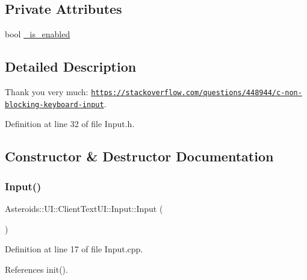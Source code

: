 \subsection*{Private Attributes}
\begin{DoxyCompactItemize}
\item 
bool \hyperlink{classAsteroids_1_1UI_1_1ClientTextUI_1_1Input_a244dd7d6eb9b842cddfaf1296e017ec5}{\+\_\+is\+\_\+enabled}
\end{DoxyCompactItemize}


\subsection{Detailed Description}
Thank you very much\+: \href{https://stackoverflow.com/questions/448944/c-non-blocking-keyboard-input}{\tt https\+://stackoverflow.\+com/questions/448944/c-\/non-\/blocking-\/keyboard-\/input}. 

Definition at line 32 of file Input.\+h.



\subsection{Constructor \& Destructor Documentation}
\mbox{\label{classAsteroids_1_1UI_1_1ClientTextUI_1_1Input_aef07e99edf7199b0d89c185fbac19418}} 
\subsubsection{\texorpdfstring{Input()}{Input()}}
{\footnotesize\ttfamily Asteroids\+::\+U\+I\+::\+Client\+Text\+U\+I\+::\+Input\+::\+Input (\begin{DoxyParamCaption}{ }\end{DoxyParamCaption})}



Definition at line 17 of file Input.\+cpp.



References init().

